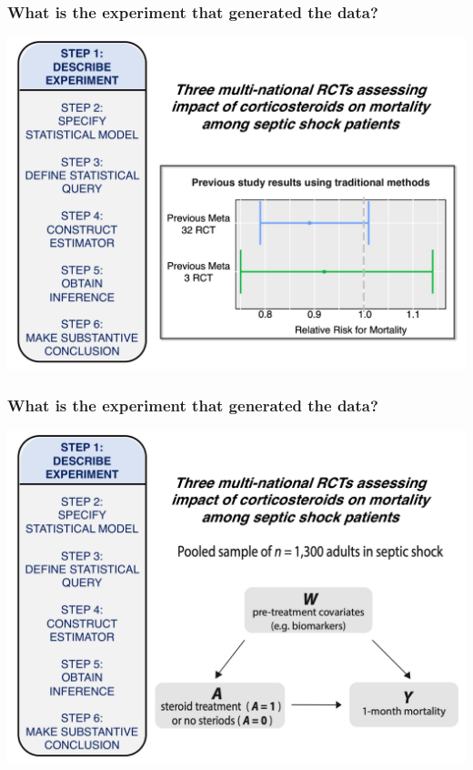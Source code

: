 \documentclass[t]{beamer}
\begin{document}
\begin{frame}
  \frametitle{What is the experiment that generated the data?}
  \vspace{-20pt}
  \begin{center}
  \includegraphics[width = 1.05\textwidth]{figures/roadmap1_1.pdf}
  \end{center}
\end{frame}

\begin{frame}
  \frametitle{What is the experiment that generated the data?}
  \vspace{-20pt}
  \begin{center}
  \includegraphics[width = 1.05\textwidth]{figures/roadmap1_2.pdf}
  \end{center}
\end{frame}
\end{document}
